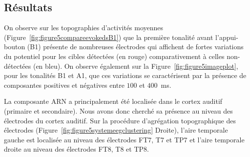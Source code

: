 \begin{landscape}
\begin{figure*}[!t]
\begin{tabular}{cccc}
\end{tabular}
\caption[Image plot des ERP hits/miss entre $-200$:$+500$~ms pour B2, B1, A1 et A2]{Potentiels évoqués entre $-200$ et $+500$~ms (abscisse) sur toutes les électrodes (ordonnée) pour les cibles détectées (panel du haut) et les cibles non-détectées (panel du bas) pour les quatre tonalités (de gauche à droite : B2, B1, A1 et A2). L'échelle d'amplitude des potentiels évoqués est située entre $-1.5$ (bleu) et $+1.5$ (rouge) $\mu Volt$.}
\label{fig:figure5imageplot}
\end{figure*}
\end{landscape}

\subsection{Résultats}
\label{etude2analysesERPresultats}

On observe sur les topographies d'activités moyennes (Figure~\ref{fig:figure5compareevokedsB1}) que la première tonalité avant l'appui-bouton (B1) présente de nombreuses électrodes qui affichent de fortes variations du potentiel pour les cibles détectées (en rouge) comparativement à celles non-détectées (en bleu). 
On observe également sur la Figure~\ref{fig:figure5imageplot}, pour les tonalités B1 et A1, que ces variations se caractérisent par la présence de composantes positives et négatives entre $100$ et $400$~ms. 

La composante ARN a principalement été localisée dans le cortex auditif (primaire et secondaire).
Nous avons donc cherché sa présence au niveau des électrodes du cortex auditif. 
Sur la procédure d'agrégation topographique des électrodes (Figure~\ref{fig:figure5systemeegclustering} Droite), l'aire temporale gauche est localisée au niveau des électrodes FT7, T7 et TP7 et l'aire temporale droite au niveau des électrodes FT8, T8 et TP8. 

